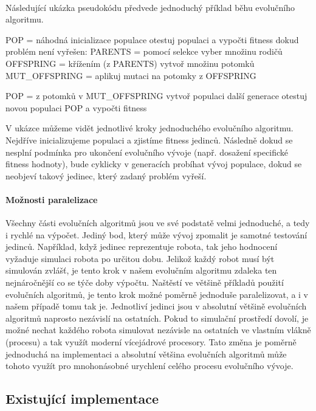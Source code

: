 \paragraph{}
Následující ukázka pseudokódu předvede jednoduchý příklad běhu evolučního
algoritmu. 
\pagebreak
\begin{code}
POP = náhodná inicializace populace
otestuj populaci a vypočti fitness
dokud problém není vyřešen:
    PARENTS = pomocí selekce vyber množinu rodičů
    OFFSPRING = křížením (z PARENTS) vytvoř množinu potomků
    MUT_OFFSPRING = aplikuj mutaci na potomky z OFFSPRING

    POP = z potomků v MUT_OFFSPRING vytvoř populaci další generace
    otestuj novou populaci POP a vypočti fitness
\end{code}

V ukázce můžeme vidět jednotlivé kroky jednoduchého evolučního algoritmu.
Nejdříve inicializujeme populaci a zjistíme fitness jedinců. Následně dokud se
nesplní podmínka pro ukončení evolučního vývoje (např. dosažení specifické
fitness hodnoty), bude cyklicky v generacích probíhat vývoj populace, dokud se
neobjeví takový jedinec, který zadaný problém vyřeší.

\paragraph{Možnosti paralelizace}
Všechny části evolučních algoritmů jsou ve své podstatě velmi jednoduché, a
tedy i rychlé na výpočet. Jediný bod, který může vývoj zpomalit je samotné
testování jedinců. Například, když jedinec reprezentuje robota, tak jeho
hodnocení vyžaduje simulaci robota po určitou dobu. Jelikož každý robot musí
být simulován zvlášť, je tento krok v našem evolučním algoritmu zdaleka ten
nejnáročnější co se týče doby výpočtu. Naštěstí ve většině příkladů použití
evolučních algoritmů, je tento krok možné poměrně jednoduše paralelizovat, a i
v našem případě tomu tak je. Jednotliví jedinci jsou v absolutní většině
evolučních algoritmů naprosto nezávislí na ostatních. Pokud to simulační
prostředí dovolí, je možné nechat každého robota simulovat nezávisle na
ostatních ve vlastním vlákně (procesu) a tak využít moderní vícejádrové
procesory. Tato změna je poměrně jednoduchá na implementaci a absolutní většina
evolučních algoritmů může tohoto využít pro mnohonásobné urychlení celého
procesu evolučního vývoje.

\subsection{Existující implementace} \label{EA-impl}

